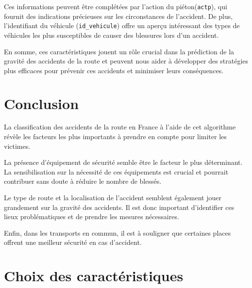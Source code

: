 \documentclass[french]{article}
\begin{document}
Ces informations peuvent être complétées par l'action du piéton(\verb|actp|), qui fournit des indications précieuses sur les circonstances de l'accident. De plus, l'identifiant du véhicule (\verb|id_vehicule|) offre un aperçu intéressant des types de véhicules les plus susceptibles de causer des blessures lors d'un accident.

En somme, ces caractéristiques jouent un rôle crucial dans la prédiction de la gravité  des accidents de la route et peuvent nous aider à développer des stratégies plus efficaces pour prévenir ces accidents et minimiser leurs conséquences.

\section{Conclusion}
La classification des accidents de la route en France à l'aide de cet algorithme révèle les facteurs les plus importants à prendre en compte pour limiter les victimes.


La présence d'équipement de sécurité semble être le facteur le plus déterminant. La sensibilisation sur la nécessité de ces équipements est crucial et pourrait contribuer sans doute à réduire le nombre de blessés.


Le type de route et la localisation de l'accident semblent également jouer grandement sur la gravité des accidents. Il est donc important d'identifier ces lieux problématiques et de prendre les mesures nécessaires.


Enfin, dans les transports en commun, il est à souligner que certaines places offrent une meilleur sécurité en cas d'accident.


\newpage





\newpage

\appendix

\section{Choix des caractéristiques}
\end{document}
